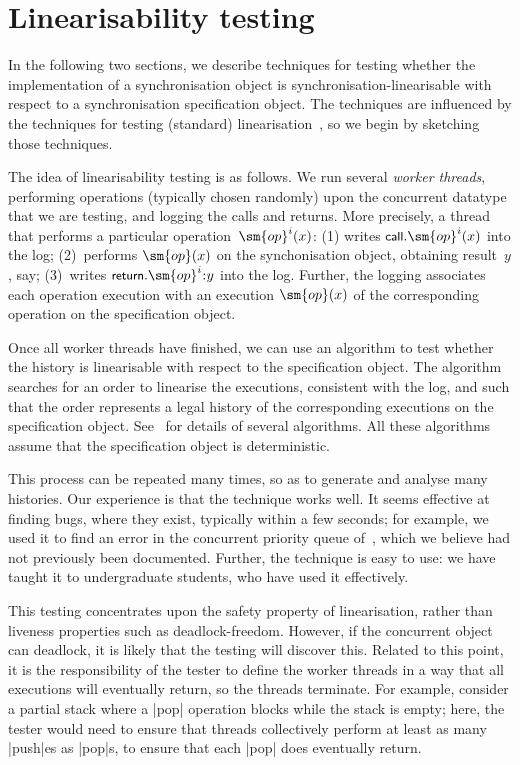 \section{Linearisability testing}
\label{sec:lin-testing}

In the following two sections, we describe techniques for testing whether the
implementation of a synchronisation object is synchronisation-linearisable
with respect to a synchronisation specification object.
%
The techniques are influenced by the techniques for testing (standard)
linearisation~\cite{wing-gong,gavin:lin-testing}, so we begin by sketching
those techniques.

The idea of linearisability testing is as follows.  We run several
\emph{worker threads}, performing operations (typically chosen randomly) upon
the concurrent datatype that we are testing, and logging the calls and
returns.  More precisely, a thread that performs a particular
operation~$\sm{op}^i(x)$: (1) writes $\call.\sm{op}^i(x)$ into the log;
(2)~performs $\sm{op}(x)$ on the synchonisation object, obtaining result~$y$,
say; (3)~writes $\return.\sm{op}^i \:: y$ into the log.  Further, the logging
associates each operation execution with an execution $\sm{op}(x)$ of the
corresponding operation on the specification object.

Once all worker threads have finished, we can use an algorithm to test whether
the history is linearisable with respect to the specification object.  The
algorithm searches for an order to linearise the executions, consistent with
the log, and such that the order represents a legal history of the
corresponding executions on the specification object.
See~\cite{wing-gong,gavin:lin-testing} for details of several algorithms.
All these algorithms assume that the specification object is deterministic.

This process can be repeated many times, so as to generate and analyse many
histories.  Our experience is that the technique works well.  It seems
effective at finding bugs, where they exist, typically within a few seconds;
for example, we used it to find an error in the concurrent priority queue
of~\cite{faulty-pri-queue}, which we believe had not previously been
documented.  Further, the technique is easy to use: we have taught it to
undergraduate students, who have used it effectively.

This testing concentrates upon the safety property of
linearisation, rather than liveness properties such as deadlock-freedom.
However, if the concurrent object can deadlock, it is likely that the testing
will discover this.  Related to this point, it is the responsibility of the
tester to define the worker threads in a way that all executions will
eventually return, so the threads terminate.  For example, consider a partial
stack where a |pop| operation blocks while the stack is empty; here, the
tester would need to ensure that threads collectively perform at least as many
|push|es as |pop|s, to ensure that each |pop| does eventually return.

